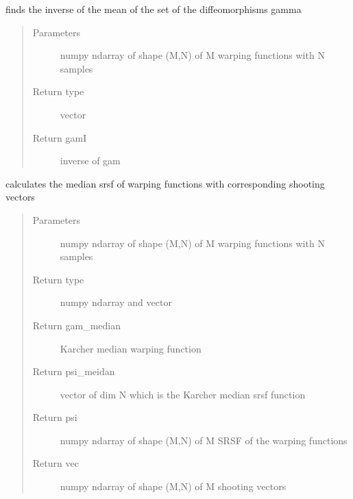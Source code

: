 \documentclass[letterpaper,10pt,english]{sphinxmanual}
\begin{document}
\begin{fulllineitems}
\label{\detokenize{utility_functions:utility_functions.SqrtMeanInverse}}
finds the inverse of the mean of the set of the diffeomorphisms gamma
\begin{quote}\begin{description}
\item[{Parameters}] \leavevmode
{} \textendash{} numpy ndarray of shape (M,N) of M warping functions
with N samples

\item[{Return type}] \leavevmode
vector

\item[{Return gamI}] \leavevmode
inverse of gam

\end{description}\end{quote}

\end{fulllineitems}


\begin{fulllineitems}
\label{\detokenize{utility_functions:utility_functions.SqrtMedian}}
calculates the median srsf of warping functions with corresponding shooting vectors
\begin{quote}\begin{description}
\item[{Parameters}] \leavevmode
{} \textendash{} numpy ndarray of shape (M,N) of M warping functions
with N samples

\item[{Return type}]  numpy ndarray and vector

\item[{Return gam\_median}] \leavevmode
Karcher median warping function

\item[{Return psi\_meidan}] \leavevmode
vector of dim N which is the Karcher median srsf function

\item[{Return psi}] \leavevmode
numpy ndarray of shape (M,N) of M SRSF of the warping functions

\item[{Return vec}] \leavevmode
numpy ndarray of shape (M,N) of M shooting vectors

\end{description}\end{quote}

\end{fulllineitems}
\end{document}
